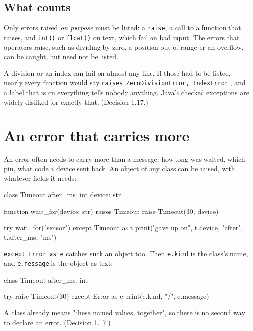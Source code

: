 \subsection{What counts}

Only errors raised \emph{on purpose} must be listed: a \verb|raise|, a
call to a function that raises, and \verb|int()| or \verb|float()| on
text, which fail on bad input. The errors that operators raise, such
as dividing by zero, a position out of range or an overflow, can be
caught, but need not be listed.

\begin{why}
A division or an index can fail on almost any line. If those had to be
listed, nearly every function would say \verb|raises ZeroDivisionError, IndexError|
, and a label that is on everything tells nobody anything.
Java's checked exceptions are widely disliked for exactly that.
(Decision 1.17.)
\end{why}

\section{An error that carries more}

An error often needs to carry more than a message: how long was waited,
which pin, what code a device sent back. An object of any class can be
raised, with whatever fields it needs:

\begin{zeno}
class Timeout {
    after_ms: int
    device: str
}

function wait_for(device: str) raises Timeout {
    raise Timeout(30, device)
}

try {
    wait_for("sensor")
} except Timeout as t {
    print("gave up on", t.device, "after", t.after_ms, "ms")
}
\end{zeno}

\verb|except Error as e| catches such an object too. Then
\verb|e.kind| is the class's name, and \verb|e.message| is the object
as text:

\begin{zeno}
class Timeout {
    after_ms: int
}

try {
    raise Timeout(30)
} except Error as e {
    print(e.kind, "/", e.message)
}
\end{zeno}

\begin{why}
A class already means "these named values, together", so there is no
second way to declare an error. (Decision 1.17.)
\end{why}

